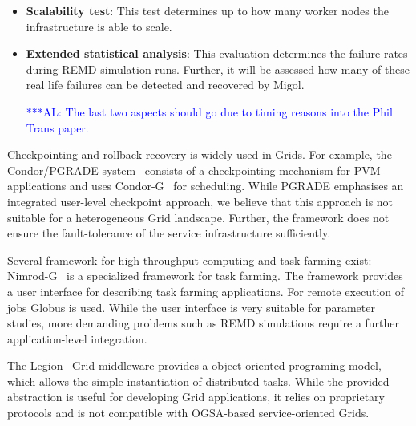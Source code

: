 \documentclass[times, 10pt,twocolumn]{article}
\newcommand{\alnote}[1]{ {\textcolor{blue} { ***AL: #1 }}}
\begin{document}
\begin{itemize}
    \item \textbf{Scalability test}: This test determines up to how many worker nodes the infrastructure is able to scale.
    \item \textbf{Extended statistical analysis}: This evaluation determines the failure rates during REMD simulation runs. Further, it will be assessed how many of these real life failures can be detected and recovered by Migol. 
                                                
    \alnote{The last two aspects should go due to timing reasons into the Phil Trans paper.}
\end{itemize}
                                             
     
                                             



Checkpointing and rollback recovery is widely used in Grids. For example, the Condor/PGRADE system~\cite{DBLP:conf/eagc/KovacsK04} consists 
of a checkpointing mechanism for PVM applications and uses Condor-G~\cite{citeulike:291860} for scheduling. 
While PGRADE emphasises an integrated user-level checkpoint approach, we believe 
that this approach is not suitable for a heterogeneous Grid landscape. Further, 
the framework does not ensure the fault-tolerance of the
service infrastructure sufficiently.
                                 
Several framework for high throughput computing and task farming exist:
Nimrod-G~\cite{buyya00nimrodg} is a specialized framework for task farming. The framework provides a user interface for describing task farming applications. For remote execution of jobs Globus is used. While the user interface is very suitable for parameter studies, more demanding problems such as REMD simulations require a further application-level integration.

The Legion~\cite{689541} Grid middleware provides a object-oriented programing model, which allows the simple instantiation of distributed tasks. While the provided abstraction is useful for developing Grid applications, it relies on proprietary protocols and is not compatible with OGSA-based service-oriented Grids.
\end{document}
